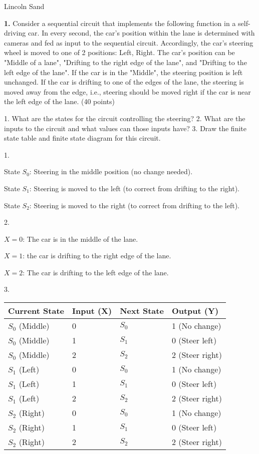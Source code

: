 \documentclass{article}
\begin{document}
\Large{Lincoln Sand}


\textbf{1.} Consider a sequential circuit that implements the following function in a self-driving car.
In every second, the car's position within the lane is determined with cameras and fed as input to the
sequential circuit. Accordingly, the car's steering wheel is moved to one of 2 positions: Left, Right.
The car's position can be "Middle of a lane", "Drifting to the right edge of the lane", and "Drifting
to the left edge of the lane". If the car is in the "Middle", the steering position is left unchanged.
If the car is drifting to one of the edges of the lane, the steering is moved away from the edge, i.e.,
steering should be moved right if the car is near the left edge of the lane. (40 points)

    1. What are the states for the circuit controlling the steering?
    2. What are the inputs to the circuit and what values can those inputs have?
    3. Draw the finite state table and finite state diagram for this circuit.

1.

State $S_0$: Steering in the middle position (no change needed).

State $S_1$: Steering is moved to the left (to correct from drifting to the right).

State $S_2$: Steering is moved to the right (to correct from drifting to the left).

2.

$X = 0$: The car is in the middle of the lane.

$X = 1$: the car is drifting to the right edge of the lane.

$X = 2$: The car is drifting to the left edge of the lane.

3. 

\begin{table}[htbp]
\centering
\begin{tabular}{@{}llll@{}}
\toprule
Current State & Input (X) & Next State & Output (Y) \\ \midrule
$S_0$ (Middle)   & 0          & $S_0$         & 1 (No change) \\
$S_0$ (Middle)   & 1          & $S_1$         & 0 (Steer left) \\
$S_0$ (Middle)   & 2          & $S_2$         & 2 (Steer right) \\
$S_1$ (Left)     & 0          & $S_0$         & 1 (No change) \\
$S_1$ (Left)     & 1          & $S_1$         & 0 (Steer left) \\
$S_1$ (Left)     & 2          & $S_2$         & 2 (Steer right) \\
$S_2$ (Right)    & 0          & $S_0$         & 1 (No change) \\
$S_2$ (Right)    & 1          & $S_1$         & 0 (Steer left) \\
$S_2$ (Right)    & 2          & $S_2$         & 2 (Steer right) \\ \bottomrule
\end{tabular}
\end{table}
\end{document}
